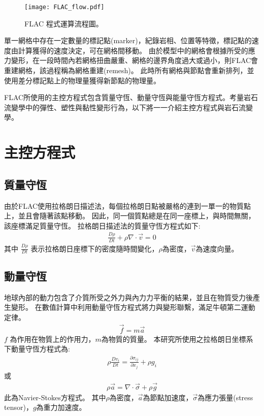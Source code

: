 \begin{figure*}[ht!]
    \centering
    \texttt{[image: FLAC\_flow.pdf]}
    \caption[FLAC 程式運算流程圖]{FLAC 程式運算流程圖。}
    \label{fig::FLAC_method}
\end{figure*}
單一網格中存在一定數量的標記點(marker)，紀錄岩相、位置等特徵，標記點的速度由計算獲得的速度決定，可在網格間移動。
由於模型中的網格會根據所受的應力變形，在一段時間內若網格扭曲嚴重、網格的邊界角度過大或過小，則FLAC會重建網格，該過程稱為網格重建(remesh)。
此時所有網格與節點會重新排列，並使用差分標記點上的物理量獲得新節點的物理量。

FLAC所使用的主控方程式包含質量守恆、動量守恆與能量守恆方程式。考量岩石流變學中的彈性、塑性與黏性變形行為，以下將一一介紹主控方程式與岩石流變學。
\section{主控方程式}

\subsection{質量守恆}
由於FLAC使用拉格朗日描述法，每個拉格朗日點被嚴格的連到一單一的物質點上，並且會隨著該點移動。
因此，同一個質點總是在同一座標上，與時間無關，該座標滿足質量守恆。
拉格朗日描述法的質量守恆方程式如下:
\begin{align}
\frac{D\rho}{Dt}+\rho\nabla\cdot\vec v =0 
\label{eqn:MASS_Lagrangian}
\end{align}
其中 $\frac{D\rho}{Dt}$ 表示拉格朗日座標下的密度隨時間變化，$\rho$為密度，$\vec v$為速度向量。

\subsection{動量守恆}
地球內部的動力包含了介質所受之外力與內力力平衡的結果，並且在物質受力後產生變形。
在數值計算中利用動量守恆方程式將力與變形聯繫，滿足牛頓第二運動定律。
\begin{align}
\vec f=m\vec a
\end{align}
$f$ 為作用在物質上的作用力，$m$為物質的質量。
本研究所使用之拉格朗日坐標系下動量守恆方程式為:
\begin{align}
\rho \frac{ Dv_{i}}{Dt} = \frac{\partial \sigma_{ij}}{\partial x_j}+\rho g_i\label{eqn:momentum Lagrangian}
\end{align}
或
\begin{align}
\rho \vec a = \nabla\cdot\vec\sigma+\rho\vec g\label{eqn:momentum Lagrangian2}
\end{align}
此為Navier-Stokes方程式。 其中$\rho$為密度，$\vec a$為節點加速度，$\vec\sigma$為應力張量(stress tensor)，$g$為重力加速度。

